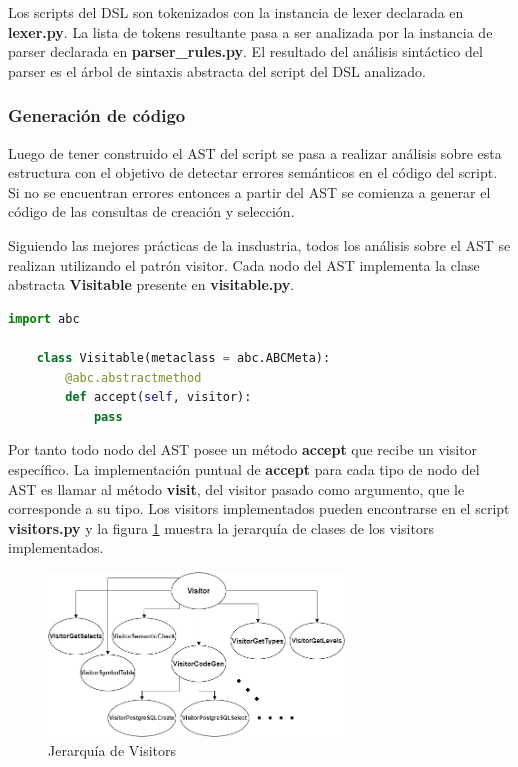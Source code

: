 Los scripts del DSL son tokenizados con la instancia de lexer declarada en \textbf{lexer.py}. La lista de tokens 
resultante pasa a ser analizada por la instancia de parser declarada en \textbf{parser\_rules.py}. El resultado 
del an\'alisis sint\'actico del parser es el \'arbol de sintaxis abstracta del script del DSL analizado.


\subsubsection{Generaci\'on de c\'odigo}

Luego de tener construido el AST del script se pasa a realizar an\'alisis sobre esta estructura con 
el objetivo de detectar errores sem\'anticos en el c\'odigo del script. Si no se encuentran errores 
entonces a partir del AST se comienza a generar el c\'odigo de las consultas de creaci\'on y selecci\'on.

Siguiendo las mejores pr\'acticas de la insdustria, todos los an\'alisis sobre el AST se realizan 
utilizando el patr\'on visitor\cite{buttner2004digging}. Cada nodo del AST implementa la clase abstracta 
\textbf{Visitable} presente en \textbf{visitable.py}. 

\begin{lstlisting}[label={code:visitable}, caption={Clase abstracta Visitable}, language={python}]
    import abc

    class Visitable(metaclass = abc.ABCMeta):
        @abc.abstractmethod
        def accept(self, visitor):
            pass
\end{lstlisting}

Por tanto todo nodo del AST posee un m\'etodo \textbf{accept} que recibe un visitor espec\'ifico. La implementaci\'on 
puntual de \textbf{accept} para cada tipo de nodo del AST es llamar al m\'etodo \textbf{visit}, del visitor pasado como argumento, 
que le corresponde a su tipo. Los visitors implementados pueden encontrarse en el script \textbf{visitors.py} y la 
figura \ref{fig:visitors} muestra la jerarqu\'ia de clases de los visitors implementados.

\begin{figure}[htb]
    \centering
    \includegraphics[width=0.7\textwidth]{Graphics/visitor.drawio.png}
    \caption{Jerarqu\'ia de Visitors}
    \label{fig:visitors}
\end{figure}

